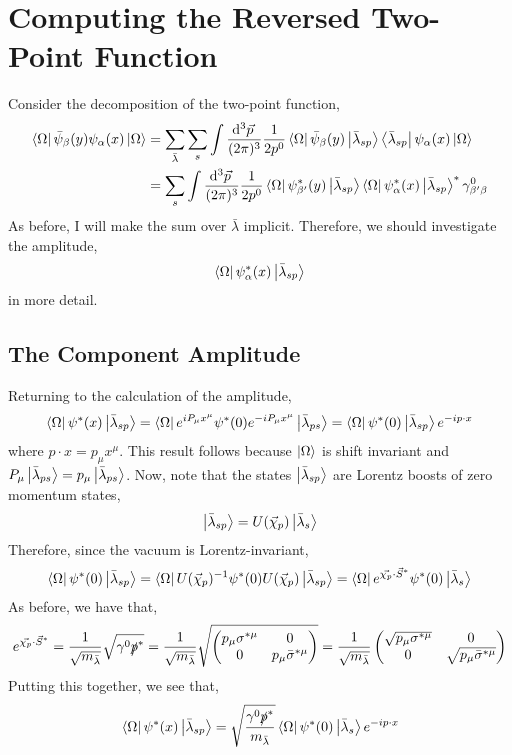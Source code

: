 \documentclass[12pt]{article}
\begin{document}
\section{Computing the Reversed Two-Point Function}

Consider the decomposition of the two-point function,
\begin{align*}
\left< \Omega \right| \bar{\psi}_{\beta}(y) \psi_{\alpha}(x) \left| \Omega \right> & = \sum_{\bar{\lambda}} \sum_{s} \int \frac{\mathrm{d}^{3} \vec{p} \:}{(2 \pi)^3} \frac{1}{2 p^0} \left< \Omega \right| \bar{\psi}_{\beta}(y) \left| {\bar{\lambda}}_{s p} \right> \left< {\bar{\lambda}}_{s p} \right| \psi_{\alpha}(x) \left| \Omega \right> 
\\
& = \sum_{s} \int \frac{\mathrm{d}^{3} \vec{p} \:}{(2 \pi)^3} \frac{1}{2 p^0} \left< \Omega \right| \psi^*_{\beta'}(y) \left| {\bar{\lambda}}_{s p} \right> \left< \Omega \right| \psi^*_{\alpha}(x) \left| {\bar{\lambda}}_{s p} \right>^* \gamma^0_{\beta' \beta}
\end{align*}
As before, I will make the sum over $\bar{\lambda}$ implicit. Therefore, we should investigate the amplitude, 
\[  \left< \Omega \right| \psi^*_{\alpha}(x) \left| {\bar{\lambda}}_{s p} \right> \]
in more detail. 

\subsection{The Component Amplitude}
Returning to the calculation of the amplitude,
\[  \left< \Omega \right| \psi^*(x) \left| {\bar{\lambda}}_{s p} \right> = \left< \Omega \right| e^{i P_\mu x^\mu} \psi^*(0) e^{- i P_{\mu} x^\mu}  \left| {\bar{\lambda}}_{ps} \right> =  \left< \Omega \right|  \psi^*(0)  \left| {\bar{\lambda}}_{sp} \right> e^{- i p \cdot x} \]
where $p \cdot x = p_\mu x^\mu$. This result follows because $\left| \Omega \right>$ is shift invariant and $P_\mu \left| {\bar{\lambda}}_{ps} \right> = p_\mu \left| {\bar{\lambda}}_{ps} \right>$. 
Now, note that the states $\left| {\bar{\lambda}}_{sp} \right>$ are Lorentz boosts of zero momentum states,
\[ \left| {\bar{\lambda}}_{sp} \right> = U(\vec{\chi}_p) \left| {\bar{\lambda}}_s \right> \]
Therefore, since the vacuum is Lorentz-invariant,
\[  \left< \Omega \right| \psi^*(0) \left| {\bar{\lambda}}_{s p} \right> = \left< \Omega \right| U(\vec{\chi}_p)^{-1}  \psi^*(0) U(\vec{\chi}_p) \left| {\bar{\lambda}}_{sp} \right> = \left< \Omega \right| e^{\vec{\chi_p} \cdot \vec{S}^*} \psi^*(0)  \left| {\bar{\lambda}}_{s} \right> \]
As before, we have that,
\begin{align*}
e^{\vec{\chi_p} \cdot \vec{S}^*} = \frac{1}{\sqrt{m_{\bar{\lambda}}}} \sqrt{\gamma^0 \slashed{p}^*} = \frac{1}{\sqrt{m_{\bar{\lambda}}}} \sqrt{
\begin{pmatrix}
p_\mu \sigma^{*\mu} & 0 \\
0 & p_\mu \bar{\sigma}^{*\mu} 
\end{pmatrix}}
= \frac{1}{\sqrt{m_{\bar{\lambda}}}} 
\begin{pmatrix}
\sqrt{p_\mu \sigma^{*\mu}} & 0 \\
0 & \sqrt{p_\mu \bar{\sigma}^{*\mu}}
\end{pmatrix}
\end{align*}
Putting this together, we see that,
\[ \left< \Omega \right| \psi^*(x) \left| {\bar{\lambda}}_{s p} \right> = \sqrt{\frac{\gamma^0 \slashed{p}^*}{m_{\bar{\lambda}}}} \left< \Omega \right| \psi^*(0) \left| {\bar{\lambda}}_{s} \right> e^{ - i p \cdot x} \] 
\end{document}

